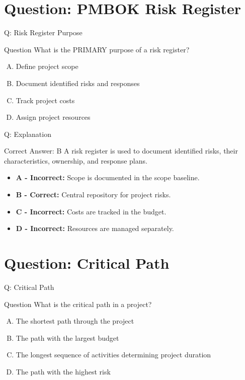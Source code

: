 \documentclass{beamer}
\begin{document}
	\section{Question: PMBOK Risk Register}
	
	\begin{frame}{Q: Risk Register Purpose}
		\begin{block}{Question}
			What is the PRIMARY purpose of a risk register?
		\end{block}
		
		\begin{enumerate}[(A)]
			\item Define project scope
			\item Document identified risks and responses
			\item Track project costs
			\item Assign project resources
		\end{enumerate}
	\end{frame}
	
	\begin{frame}{Q: Explanation}
		\begin{block}{Correct Answer: B}
			A risk register is used to document identified risks,
			their characteristics, ownership, and response plans.
		\end{block}
		
		\begin{itemize}
			\item \textbf{A - Incorrect:} Scope is documented in the scope baseline.
			\item \textbf{B - Correct:} Central repository for project risks.
			\item \textbf{C - Incorrect:} Costs are tracked in the budget.
			\item \textbf{D - Incorrect:} Resources are managed separately.
		\end{itemize}
	\end{frame}
	
	\section{Question: Critical Path}
	
	\begin{frame}{Q: Critical Path}
		\begin{block}{Question}
			What is the critical path in a project?
		\end{block}
		
		\begin{enumerate}[(A)]
			\item The shortest path through the project
			\item The path with the largest budget
			\item The longest sequence of activities determining project duration
			\item The path with the highest risk
		\end{enumerate}
	\end{frame}
	
\end{document}
